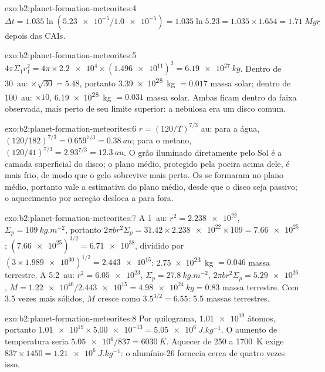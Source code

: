 \begin{solution}{exo:b2:planet-formation-meteorites:4}
$\Delta t = 1.035\ln(\num{5.23e-5}/\num{1.0e-5}) = 1.035\ln 5.23 =
1.035\times1.654 = \qty{1.71}{Myr}$ depois das CAIs.
\end{solution}

\begin{solution}{exo:b2:planet-formation-meteorites:5}
$4\pi\Sigma_1 r_1^2 = 4\pi\times\num{2.2e4}\times(\num{1.496e11})^2 =
\qty{6.19e27}{kg}$. Dentro de \qty{30}{au}: $\times\sqrt{30} = 5.48$, portanto
\qty{3.39e28}{kg} $= 0.017$ massa solar; dentro de \qty{100}{au}: $\times10$,
\qty{6.19e28}{kg} $= 0.031$ massa solar. Ambas ficam dentro da faixa observada,
mais perto de seu limite superior: a nebulosa era um disco comum.
\end{solution}

\begin{solution}{exo:b2:planet-formation-meteorites:6}
$r = (120/T)^{7/3}$ au: para a água, $(120/182)^{7/3} = 0.659^{7/3} =
\qty{0.38}{au}$; para o metano, $(120/41)^{7/3} = 2.93^{7/3} = \qty{12.3}{au}$.
O grão iluminado diretamente pelo Sol é a camada superficial do disco; o plano médio,
protegido pela poeira acima dele, é mais frio, de modo que o gelo sobrevive mais perto. Os
 se formaram no plano médio, portanto vale a estimativa do plano médio, desde que
o disco seja passivo; o aquecimento por acreção desloca a  para fora.
\end{solution}

\begin{solution}{exo:b2:planet-formation-meteorites:7}
A \qty{1}{au}: $r^2 = \num{2.238e22}$, $\Sigma_p = \qty{109}{kg.m^{-2}}$, portanto
$2\pi b r^2\Sigma_p = 31.42\times\num{2.238e22}\times109 = \num{7.66e25}$;
$(\num{7.66e25})^{3/2} = \num{6.71e38}$, dividido por
$(3\times\num{1.989e30})^{1/2} = \num{2.443e15}$: \qty{2.75e23}{kg}
$= 0.046$ massa terrestre. A \qty{5.2}{au}: $r^2 = \num{6.05e23}$,
$\Sigma_p = \qty{27.8}{kg.m^{-2}}$, $2\pi b r^2\Sigma_p = \num{5.29e26}$,
$M = \num{1.22e40}/\num{2.443e15} = \qty{4.98e24}{kg} = 0.83$ massa terrestre.
Com \num{3.5} vezes mais sólidos, $M$ cresce como $3.5^{3/2} = 6.55$: 5.5 massas
terrestres.
\end{solution}

\begin{solution}{exo:b2:planet-formation-meteorites:8}
Por quilograma, $\num{1.01e19}$ átomos, portanto
$\num{1.01e19}\times\num{5.00e-13} = \qty{5.05e6}{J.kg^{-1}}$. O aumento de
temperatura seria $\num{5.05e6}/837 = \qty{6030}{K}$. Aquecer de \num{250} a
\qty{1700}{K} exige $837\times1450 = \qty{1.21e6}{J.kg^{-1}}$: o alumínio-26
fornecia cerca de quatro vezes isso.
\end{solution}

